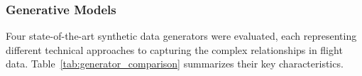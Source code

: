 \documentclass[conference]{IEEEtran}
\begin{document}


\subsubsection{Generative Models}

Four state-of-the-art synthetic data generators were evaluated, each representing different technical approaches to capturing the complex relationships in flight data. Table~\ref{tab:generator_comparison} summarizes their key characteristics.

\end{document}
